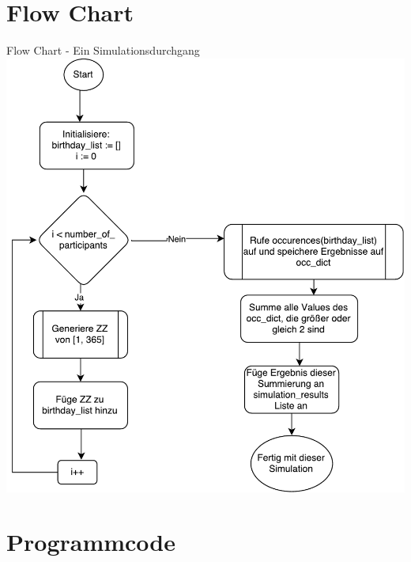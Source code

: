 \section{Flow Chart}
\begin{frame}{Flow Chart - Ein Simulationsdurchgang}
	\centering
  	\includegraphics[scale=0.4]{BSP04_Flow_Chart_2.pdf}
\end{frame}

\section{Programmcode}
